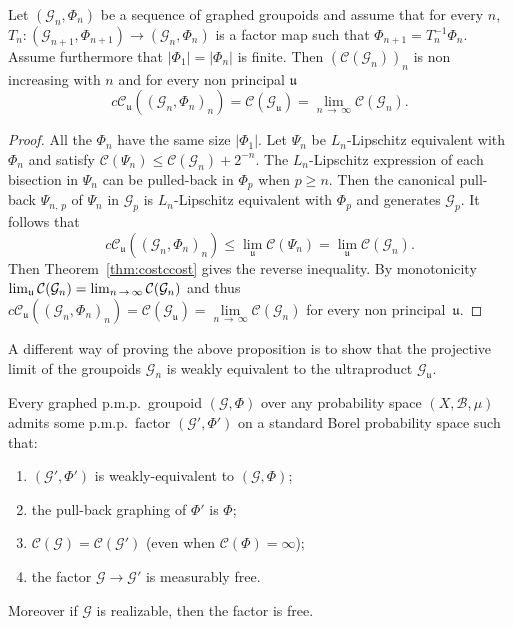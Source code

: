 \documentclass[AHL,Unicode,longabstracts,published]{cedram}
\newcommand{\cost}{\mathcal{C}}
\newcommand{\ccost}{c\mathcal{C}}
\newcommand{\cg}{\mathcal{G}}
\newcommand{\rb}{\mathscr{B}}
\newcommand{\ul}{\mathfrak{u}}
\newcommand{\pmp}{p.m.p.\ }
\begin{document}
\begin{prop}\label{prop: projective limit and costs}
Let $(\cg_n,\Phi_n)$ be a sequence of graphed groupoids and assume that for every $n$, $T_n: (\cg_{n+1},\Phi_{n+1})\to (\cg_n,\Phi_n)$ is a factor map such that $\Phi_{n+1} = T_n^{-1} \Phi_n$. Assume furthermore that $|\Phi_1|=|\Phi_n|$ is finite. Then $(\cost(\cg_n))_n$ is non increasing with $n$ and for every non principal $\ul$
\[
\ccost_\ul\left(\left(\cg_n,\Phi_n\right)_n\right)=\cost(\cg_\ul)=\lim_{n\,\to\,\infty}\cost(\cg_{n}).
\]
\end{prop}
\begin{proof}
All the $\Phi_n$ have the same size $|\Phi_1|$. Let $\Psi_n$ be $L_n$-Lipschitz equivalent with $\Phi_n$ and satisfy $\cost(\Psi_n)\leq \cost(\cg_n)+2^{-n}$. The $L_n$-Lipschitz expression of each bisection in $\Psi_n$ can be pulled-back in $\Phi_p$ when $p\geq n$. Then the canonical pull-back $\Psi_{n,\,p}$ of $\Psi_n$ in $\cg_p$ is $L_n$-Lipschitz equivalent with $\Phi_p$ and generates $\cg_p$. It follows that
\[
\ccost_\ul ((\cg_n, \Phi_n)_n)\leq \lim\limits_\ul \cost(\Psi_n)=\lim\limits_{\ul} \cost (\cg_n).
\]
Then Theorem~\ref{thm:costccost} gives the reverse inequality. By monotonicity $\lim_{\ul} \cost (\cg_n)\linebreak =\lim_{n\,\to\, \infty} \cost (\cg_n)$ and thus $\ccost_\ul ((\cg_n, \Phi_n)_n)=\cost(\cg_\ul)=\lim\limits_{n\,\to\,\infty}\cost(\cg_{n})$ for every non principal~$\ul$.
\end{proof}

A different way of proving the above proposition is to show that the projective limit of the groupoids $\cg_n$ is weakly equivalent to the ultraproduct $\cg_\ul$.

\begin{theo}\label{thm: standard factors}
Every graphed \pmp groupoid $(\cg, \Phi)$ over any probability space $(X,{\rb},\mu)$ admits some \pmp factor $(\cg', \Phi')$ on a standard Borel probability space such that:
\begin{enumerate}
\item \label{theo3.28.1}$(\cg', \Phi')$ is weakly-equivalent to $(\cg, \Phi)$;
\item \label{theo3.28.2}the pull-back graphing of $\Phi'$ is $\Phi$;
\item \label{theo3.28.3}$\cost(\cg)=\cost(\cg')$ (even when $\cost(\Phi)=\infty$); \label{it: standard factors, cost}
\item \label{theo3.28.4}the factor $\cg\to \cg'$ is measurably free.
\end{enumerate}

Moreover if $\cg$ is realizable, then the factor is free.
\end{theo}
\end{document}

